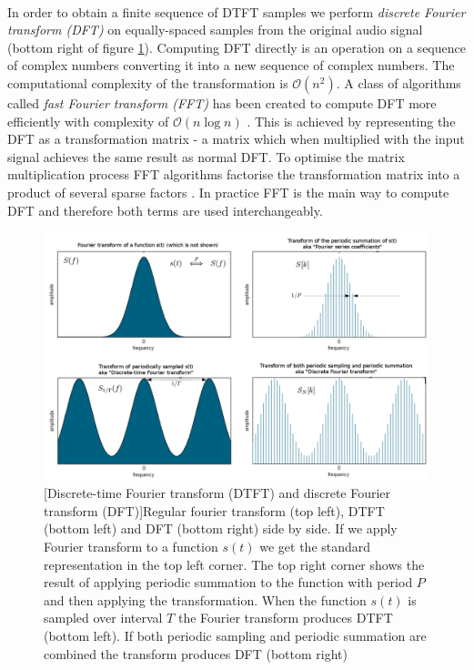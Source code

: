 \paragraph{}
In order to obtain a finite sequence of DTFT samples we perform \textit{discrete
Fourier transform (DFT)} on equally-spaced samples from the original audio
signal (bottom right of figure \ref{fig:dftdtft}). Computing DFT directly is an
operation on a sequence of complex numbers converting it into a new sequence of
complex numbers. The computational complexity of the transformation is
$\mathcal{O}(n^2)$. A class of algorithms called \textit{fast Fourier transform
(FFT)} has been created to compute DFT more efficiently with complexity of
$\mathcal{O}(n\log{}n)$ \cite{fft}. This is achieved by representing the DFT as
a transformation matrix - a matrix which when multiplied with the input signal
achieves the same result as normal DFT. To optimise the matrix multiplication
process FFT algorithms factorise the transformation matrix into a product of
several sparse factors \cite{wiki:fft}. In practice FFT is the main way to
compute DFT and therefore both terms are used interchangeably.
\begin{figure}[H]
   \centering
   \includegraphics[width=\textwidth]{Algorithms/dft.png} 
   [Discrete-time Fourier transform (DTFT) and discrete
   Fourier transform (DFT)]{Regular fourier transform (top left), DTFT (bottom
   left) and DFT (bottom right) side by side. If we apply Fourier transform to a
   function $s(t)$ we get the standard representation in the top left corner.
   The top right corner shows the result of applying periodic summation to the
   function with period $P$ and then applying the transformation. When the
   function $s(t)$ is sampled over interval $T$ the Fourier transform produces
   DTFT (bottom left). If both periodic sampling and periodic summation are
   combined the transform produces DFT (bottom right)
   \cite{wiki:periodicsummation}}
   \label{fig:dftdtft}
\end{figure}

